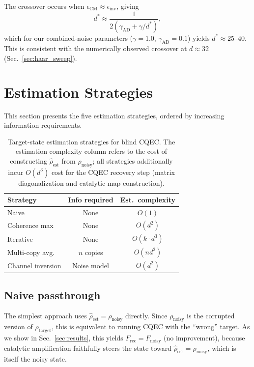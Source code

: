 \documentclass[prx,twocolumn,superscriptaddress,longbibliography,floatfix]{revtex4-2}
\newcommand{\Frec}{F_\mathrm{rec}}
\newcommand{\Fnoisy}{F_\mathrm{noisy}}
\newcommand{\rhot}{\rho_\mathrm{target}}
\newcommand{\rhon}{\rho_\mathrm{noisy}}
\newcommand{\rhoe}{\hat{\rho}_\mathrm{est}}
\begin{document}
The crossover occurs when $\epsilon_{\mathrm{CM}} \approx \epsilon_{\mathrm{inv}}$, giving
\begin{equation}
d^* \approx \frac{1}{2(\gamma_{\mathrm{AD}} + \gamma/d^*)},
\label{eq:crossover}
\end{equation}
which for our combined-noise parameters ($\gamma = 1.0$, $\gamma_{\mathrm{AD}} = 0.1$) yields $d^* \approx 25$--$40$.
This is consistent with the numerically observed crossover at $d \approx 32$ (Sec.~\ref{sec:haar_sweep}).


\section{Estimation Strategies}
\label{sec:strategies}

This section presents the five estimation strategies, ordered by increasing information requirements.

\begin{table}[b]
\caption{Target-state estimation strategies for blind CQEC.
The estimation complexity column refers to the cost of constructing $\rhoe$ from $\rhon$; all strategies additionally incur $O(d^3)$ cost for the CQEC recovery step (matrix diagonalization and catalytic map construction).}
\label{tab:strategies}
\begin{ruledtabular}
\begin{tabular}{lcc}
Strategy & Info required & Est.\ complexity \\
\hline
Naive & None & $O(1)$ \\
Coherence max & None & $O(d^2)$ \\
Iterative & None & $O(k \cdot d^3)$ \\
Multi-copy avg. & $n$ copies & $O(n d^2)$ \\
Channel inversion & Noise model & $O(d^2)$ \\
\end{tabular}
\end{ruledtabular}
\end{table}


\subsection{Naive passthrough}
\label{sec:naive}

The simplest approach uses $\rhoe = \rhon$ directly.
Since $\rhon$ is the corrupted version of $\rhot$, this is equivalent to running CQEC with the ``wrong'' target.
As we show in Sec.~\ref{sec:results}, this yields $\Frec = \Fnoisy$ (no improvement), because catalytic amplification faithfully steers the state toward $\rhoe = \rhon$, which is itself the noisy state.
\end{document}
